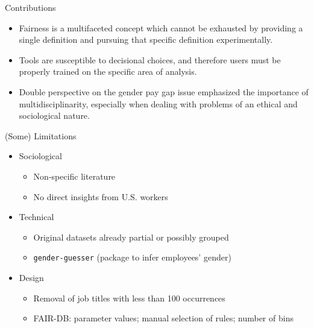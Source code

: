 \documentclass[usenames,dvipsnames]{beamer}
\begin{document}
    
    \begin{frame}{Contributions}
        \begin{itemize}
            \item Fairness is a multifaceted concept which cannot be exhausted by providing a single definition and pursuing that specific definition experimentally.
            \item Tools are susceptible to decisional choices, and therefore users must be properly trained on the specific area of analysis.
            \item Double perspective on the gender pay gap issue emphasized the importance of multidisciplinarity, especially when dealing with problems of an ethical and sociological nature.
        \end{itemize}
    \end{frame}
    
    
    \begin{frame}{(Some) Limitations}
        \begin{itemize}
            \item Sociological
            \begin{itemize}
                \item Non-specific literature
                \item No direct insights from U.S. workers
            \end{itemize}
            \item Technical
            \begin{itemize}
                \item Original datasets already partial or possibly grouped
                \item \texttt{gender-guesser} (package to infer employees' gender)
            \end{itemize}
            \item Design
            \begin{itemize}
                \item Removal of job titles with less than 100 occurrences
                \item FAIR-DB: parameter values; manual selection of rules; number of bins
            \end{itemize}
        \end{itemize}
    \end{frame}
    
\end{document}
